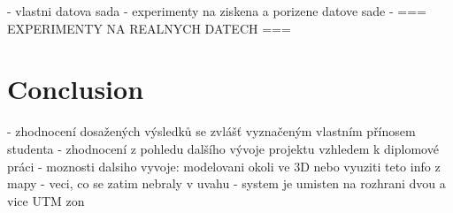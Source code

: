 - vlastni datova sada
- experimenty na ziskena a porizene datove sade
- === EXPERIMENTY NA REALNYCH DATECH ===

\chapter{Conclusion}

- zhodnocení dosažených výsledků se zvlášť vyznačeným vlastním přínosem studenta
- zhodnocení z pohledu dalšího vývoje projektu vzhledem k diplomové práci
- moznosti dalsiho vyvoje: modelovani okoli ve 3D nebo vyuziti teto info z mapy
- veci, co se zatim nebraly v uvahu
	- system je umisten na rozhrani dvou a vice UTM zon


